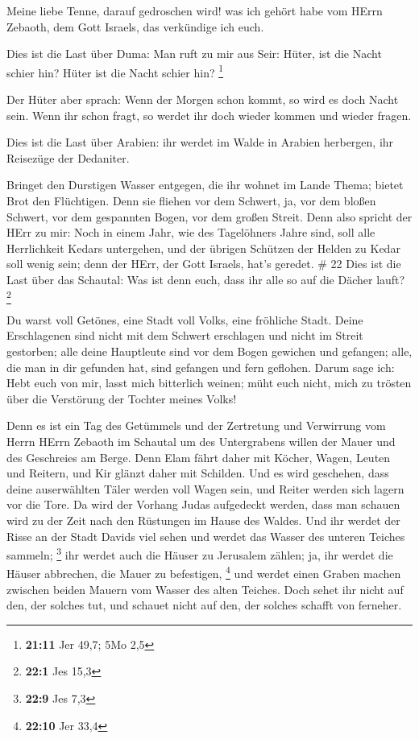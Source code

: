  Meine liebe Tenne, darauf gedroschen wird! was ich gehört
habe vom HErrn Zebaoth, dem Gott Israels, das verkündige ich euch.

 Dies ist die Last über Duma: Man ruft zu mir aus Seir:
Hüter, ist die Nacht schier hin? Hüter ist die Nacht schier hin?
\footnote{\textbf{21:11} Jer 49,7; 5Mo 2,5}

 Der Hüter aber sprach: Wenn der Morgen schon kommt, so
wird es doch Nacht sein. Wenn ihr schon fragt, so werdet ihr doch wieder
kommen und wieder fragen.

 Dies ist die Last über Arabien: ihr werdet im Walde in
Arabien herbergen, ihr Reisezüge der Dedaniter.

 Bringet den Durstigen Wasser entgegen, die ihr wohnet im
Lande Thema; bietet Brot den Flüchtigen.  Denn sie fliehen
vor dem Schwert, ja, vor dem bloßen Schwert, vor dem gespannten Bogen,
vor dem großen Streit.  Denn also spricht der HErr zu mir:
Noch in einem Jahr, wie des Tagelöhners Jahre sind, soll alle
Herrlichkeit Kedars untergehen,  und der übrigen Schützen
der Helden zu Kedar soll wenig sein; denn der HErr, der Gott Israels,
hat's geredet. \# 22  Dies ist die Last über das Schautal:
Was ist denn euch, dass ihr alle so auf die Dächer lauft? \footnote{\textbf{22:1}
  Jes 15,3}

 Du warst voll Getönes, eine Stadt voll Volks, eine
fröhliche Stadt. Deine Erschlagenen sind nicht mit dem Schwert
erschlagen und nicht im Streit gestorben;  alle deine
Hauptleute sind vor dem Bogen gewichen und gefangen; alle, die man in
dir gefunden hat, sind gefangen und fern geflohen.  Darum
sage ich: Hebt euch von mir, lasst mich bitterlich weinen; müht euch
nicht, mich zu trösten über die Verstörung der Tochter meines Volks!

 Denn es ist ein Tag des Getümmels und der Zertretung und
Verwirrung vom Herrn HErrn Zebaoth im Schautal um des Untergrabens
willen der Mauer und des Geschreies am Berge.  Denn Elam
fährt daher mit Köcher, Wagen, Leuten und Reitern, und Kir glänzt daher
mit Schilden.  Und es wird geschehen, dass deine
auserwählten Täler werden voll Wagen sein, und Reiter werden sich lagern
vor die Tore.  Da wird der Vorhang Judas aufgedeckt werden,
dass man schauen wird zu der Zeit nach den Rüstungen im Hause des
Waldes.  Und ihr werdet der Risse an der Stadt Davids viel
sehen und werdet das Wasser des unteren Teiches sammeln; \footnote{\textbf{22:9}
  Jes 7,3}  ihr werdet auch die Häuser zu Jerusalem zählen;
ja, ihr werdet die Häuser abbrechen, die Mauer zu befestigen,
\footnote{\textbf{22:10} Jer 33,4}  und werdet einen Graben
machen zwischen beiden Mauern vom Wasser des alten Teiches. Doch sehet
ihr nicht auf den, der solches tut, und schauet nicht auf den, der
solches schafft von ferneher.

